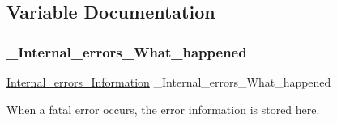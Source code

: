 \subsection{Variable Documentation}
\mbox{\label{group__RTEMSScoreIntErr_gafd0fcab7e6e37b1b51ae12e24e2fad72}} 
\subsubsection{\texorpdfstring{\_Internal\_errors\_What\_happened}{\_Internal\_errors\_What\_happened}}
{\footnotesize\ttfamily \mbox{\hyperlink{structInternal__errors__Information}{Internal\+\_\+errors\+\_\+\+Information}} \+\_\+\+Internal\+\_\+errors\+\_\+\+What\+\_\+happened}

When a fatal error occurs, the error information is stored here. 